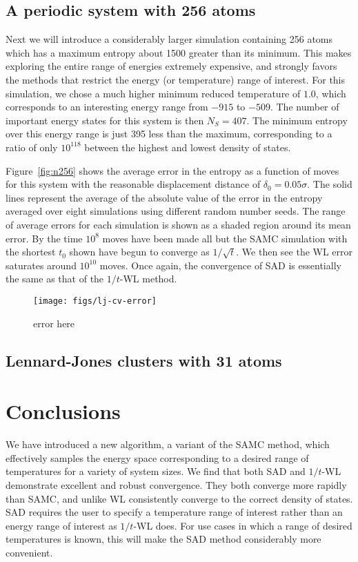 \documentclass[letterpaper,twocolumn,amsmath,amssymb,pre,aps,10pt]{revtex4-1}
\begin{document}
\subsection{A periodic system with 256 atoms}
Next we will introduce a considerably larger simulation containing 256
atoms which has a maximum entropy about 1500 greater than its minimum.
This makes exploring the entire range of energies extremely expensive,
and strongly favors the methods that restrict the energy (or
temperature) range of interest.  For this simulation, we chose a much
higher minimum reduced temperature of $1.0$, which corresponds to an
interesting energy range from $-915$ to $-509$.  The number of
important energy states for this system is then $N_S = 407$.  The
minimum entropy over this energy range is just 395 less than the
maximum, corresponding to a ratio of only $10^{118}$ between the
highest and lowest density of states.


Figure~\ref{fig:n256} shows the average error in the entropy as a
function of moves for this system with the reasonable displacement
distance of $\delta_0 = 0.05\sigma$.  The solid lines represent the
average of the absolute value of the error in the entropy averaged
over eight simulations using different random number seeds.  The range
of average errors for each simulation is shown as a shaded region
around its mean error.  By the time $10^8$ moves have been made all
but the SAMC simulation with the shortest $t_0$ shown have begun to
converge as $1/\sqrt{t}$.  We then see the WL error saturates around
$10^{10}$ moves.  Once again, the convergence of SAD is essentially
the same as that of the $1/t$-WL method.

\begin{figure}
  \texttt{[image: figs/lj-cv-error]}
  \caption{error here}
  \label{fig:lj-cv-error}
\end{figure}

\subsection{Lennard-Jones clusters with 31 atoms}

\section{Conclusions}
We have introduced a new algorithm, a variant of the SAMC method, which
effectively samples the
energy space corresponding to a desired range of temperatures for a
variety of system sizes.
%
We find that both SAD and $1/t$-WL demonstrate excellent and robust
convergence.
They both converge more rapidly than SAMC, and unlike WL consistently
converge to the correct density of states. SAD requires
the user to specify a temperature range of interest rather than an
energy range of interest as $1/t$-WL does.  For use cases in which
a range of desired temperatures is known, this will make the SAD method
considerably more convenient.
\end{document}
